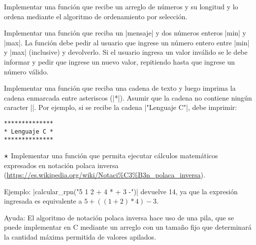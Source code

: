 \begin{ejercicio}
Implementar una función que recibe un arreglo de números y su longitud y
lo ordena mediante el algoritmo de ordenamiento por selección.
\end{ejercicio}

\begin{ejercicio}
Implementar una función que reciba un |mensaje| y dos números enteros |min| y
|max|. La función debe pedir al usuario que ingrese un número entero entre
|min| y |max| (inclusive) y devolverlo. Si el usuario ingresa un valor
inválido se le debe informar y pedir que ingrese un nuevo valor, repitiendo
hasta que ingrese un número válido.
\end{ejercicio}

\begin{ejercicio}
Implementar una función que reciba una cadena de texto y
luego imprima la cadena enmarcada entre asteriscos (|*|). Asumir que la cadena
no contiene ningún caracter |\n|. Por ejemplo, si se recibe la cadena
|"Lenguaje C"|, debe imprimir:

\begin{verbatim}
**************
* Lenguaje C *
**************
\end{verbatim}
\end{ejercicio}

\begin{ejercicio}
$\dificil$ Implementar una función que permita ejecutar cálculos matemáticos
expresados en notación polaca inversa
(\url{https://es.wikipedia.org/wiki/Notaci%C3%B3n_polaca_inversa}).

Ejemplo: |calcular_rpn("5 1 2 + 4 * + 3 -")| devuelve 14, ya que la expresión
ingresada es equivalente a $5+((1+2)*4)-3$.

Ayuda: El algoritmo de notación polaca inversa hace uso de una pila,
que se puede implementar en C mediante un arreglo con un tamaño
fijo que determinará la cantidad máxima permitida de valores apilados.
\end{ejercicio}
